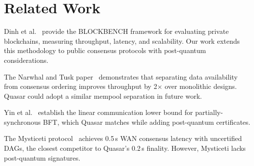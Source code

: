 \section{Related Work}

\label{sec:related}

Dinh et al.~\cite{blockbench} provide the BLOCKBENCH framework for evaluating private
blockchains, measuring throughput, latency, and scalability. Our work extends this
methodology to public consensus protocols with post-quantum considerations.

The Narwhal and Tusk paper~\cite{narwhal-tusk} demonstrates that separating data
availability from consensus ordering improves throughput by 2$\times$ over monolithic
designs. Quasar could adopt a similar mempool separation in future work.

Yin et al.~\cite{hotstuff} establish the linear communication lower bound for
partially-synchronous BFT, which Quasar matches while adding post-quantum certificates.

The Mysticeti protocol~\cite{mysticeti} achieves 0.5\,s WAN consensus latency with
uncertified DAGs, the closest competitor to Quasar's 0.2\,s finality. However,
Mysticeti lacks post-quantum signatures.

